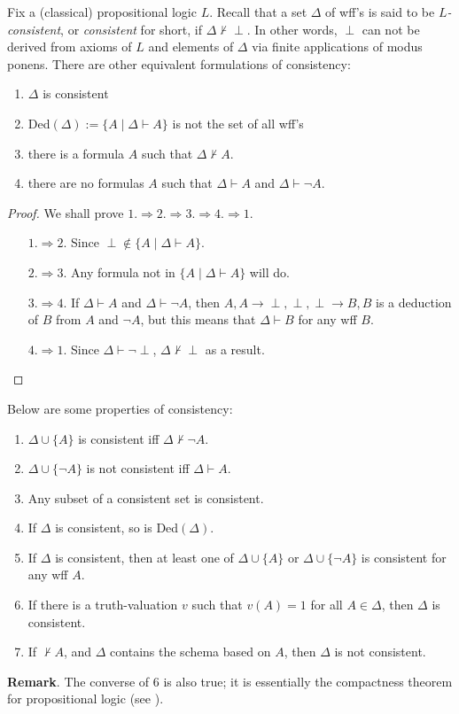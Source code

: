 \documentclass[12pt]{article}
\begin{document}
Fix a (classical) propositional logic $L$.  Recall that a set $\Delta$ of wff's is said to be \emph{$L$-consistent}, or \emph{consistent} for short, if $\Delta \not \vdash \perp$.  In other words, $\perp$ can not be derived from axioms of $L$ and elements of $\Delta$ via finite applications of modus ponens.  There are other equivalent formulations of consistency:
\begin{enumerate}
\item $\Delta$ is consistent
\item Ded$(\Delta):=\lbrace A \mid \Delta \vdash A \rbrace$ is not the set of all wff's
\item there is a formula $A$ such that $\Delta \not \vdash A$.
\item there are no formulas $A$ such that $\Delta\vdash A$ and $\Delta \vdash \neg A$.
\end{enumerate}
\begin{proof}  We shall prove $1. \Rightarrow 2. \Rightarrow 3. \Rightarrow 4. \Rightarrow 1.$
\begin{enumerate}
\item[$1. \Rightarrow 2$.]  Since $\perp \notin \lbrace A \mid \Delta \vdash A \rbrace$.
\item[$2. \Rightarrow 3$.]  Any formula not in $\lbrace A \mid \Delta \vdash A \rbrace$ will do.
\item[$3. \Rightarrow 4$.]  If $\Delta\vdash A$ and $\Delta \vdash \neg A$, then $A, A\to \perp, \perp, \perp \to B, B$ is a deduction of $B$ from $A$ and $\neg A$, but this means that $\Delta \vdash B$ for any wff $B$.
\item[$4. \Rightarrow 1$.]  Since $\Delta \vdash \neg \perp$, $\Delta \not \vdash \perp$ as a result.
\end{enumerate}
\end{proof}

Below are some properties of consistency:
\begin{enumerate}
\item $\Delta \cup \lbrace A \rbrace$ is consistent iff $\Delta \not \vdash \neg A$.
\item $\Delta \cup \lbrace \neg A \rbrace$ is not consistent iff $\Delta \vdash A$.
\item Any subset of a consistent set is consistent.
\item If $\Delta$ is consistent, so is Ded$(\Delta)$.
\item If $\Delta$ is consistent, then at least one of $\Delta \cup \lbrace A\rbrace$ or $\Delta\cup \lbrace \neg A \rbrace$ is consistent for any wff $A$.
\item If there is a truth-valuation $v$ such that $v(A)=1$ for all $A \in \Delta$, then $\Delta$ is consistent.
\item If $\not \vdash A$, and $\Delta$ contains the schema based on $A$, then $\Delta$ is not consistent.
\end{enumerate}
\textbf{Remark}.  The converse of 6 is also true; it is essentially the compactness theorem for propositional logic (see ).
\end{document}
